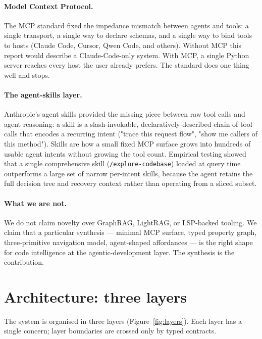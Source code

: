 \documentclass[11pt,a4paper]{article}
\begin{document}
\paragraph{Model Context Protocol.} The MCP standard \cite{anthropic2024mcp} fixed the impedance mismatch between agents and tools: a single transport, a single way to declare schemas, and a single way to bind tools to hosts (Claude Code, Cursor, Qwen Code, and others). Without MCP this report would describe a Claude-Code-only system. With MCP, a single Python server reaches every host the user already prefers. The standard does one thing well and stops.

\paragraph{The agent-skills layer.} Anthropic's agent skills \cite{anthropic2025skills} provided the missing piece between raw tool calls and agent reasoning: a skill is a slash-invokable, declaratively-described chain of tool calls that encodes a recurring intent ("trace this request flow", "show me callers of this method"). Skills are how a small fixed MCP surface grows into hundreds of usable agent intents without growing the tool count. Empirical testing showed that a single comprehensive skill (\texttt{/explore-codebase}) loaded at query time outperforms a large set of narrow per-intent skills, because the agent retains the full decision tree and recovery context rather than operating from a sliced subset.

\paragraph{What we are not.} We do not claim novelty over GraphRAG, LightRAG, or LSP-backed tooling. We claim that a particular synthesis --- minimal MCP surface, typed property graph, three-primitive navigation model, agent-shaped affordances --- is the right shape for code intelligence at the agentic-development layer. The synthesis is the contribution.

\section{Architecture: three layers}
\label{sec:architecture}

The system is organised in three layers (Figure~\ref{fig:layers}). Each layer has a single concern; layer boundaries are crossed only by typed contracts.
\end{document}
